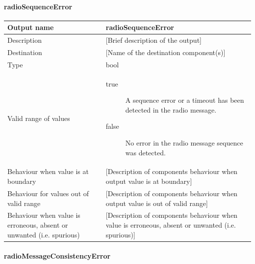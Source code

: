 \paragraph{radioSequenceError}

\begin{longtable}{p{}p{}}
\toprule
Output name				& radioSequenceError \\
\midrule
Description				& [Brief description of the output] \\
\midrule
Destination				& [Name of the destination component(s)] \\ 
\midrule
Type					& bool \\
\midrule
Valid range of values	& \begin{description}
\item[true] A sequence error or a timeout has been detected in the radio message.
\item[false] No error in the radio message sequence was detected.
\end{description} \\
\midrule
Behaviour when value is at boundary	& [Description of components behaviour when output value is at boundary] \\
\midrule
Behaviour for values out of valid range	& [Description of components behaviour when output value is out of valid range] \\
\midrule
Behaviour when value is erroneous, absent or unwanted (i.e. spurious) & [Description of components behaviour when value is erroneous, absent or unwanted (i.e. spurious)] \\
\bottomrule
\end{longtable}


\paragraph{radioMessageConsistencyError}


